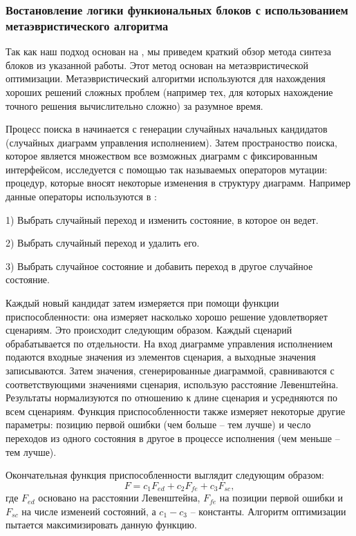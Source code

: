 \documentclass[14pt]{extarticle}
\theoremstyle{plain}
\theoremstyle{definition}
\begin{document}
\subsubsection{Востановление логики функиональных блоков с использованием
метаэвристического алгоритма}

Так как наш подход основан на \cite{rec}, мы приведем краткий обзор метода синтеза
блоков из указанной работы. Этот метод основан на метаэвристической
оптимизации. Метаэвристический алгоритми используются для нахождения хороших
решений сложных проблем (например тех, для которых нахождение точного решения
вычислительно сложно) за разумное время.

Процесс поиска в \cite{rec} начинается с генерации случайных начальных кандидатов
(случайных диаграмм управления исполнением). Затем пространоство поиска,
которое является множеством все возможных диаграмм с фиксированным интерфейсом,
исследуется с помощью так называемых операторов мутации: процедур, которые
вносят некоторые изменения в структуру диаграмм. Например данные операторы
используются в \cite{rec}:

1) Выбрать случайный переход и изменить состояние, в которое он ведет.

2) Выбрать случайный переход и удалить его.

3) Выбрать случайное состояние и добавить переход в другое случайное состояние.

Каждый новый кандидат затем измеряется при помощи функции приспособленности:
она измеряет насколько хорошо решение удовлетворяет сценариям. Это происходит
следующим образом. Каждый сценарий обрабатывается по отдельности. На вход
диаграмме управления исполнением подаются входные значения из элементов
сценария, а выходные значения записываются. Затем значения, сгенерированные
диаграммой, сравниваются с соответствующими значениями сценария, использую
расстояние Левенштейна. Результаты нормализуются по отношению к длине сценария
и усредняются по всем сценариям. Функция приспособленности также измеряет
некоторые другие параметры: позицию первой ошибки (чем больше -- тем лучше) и
чесло переходов из одного состояния в другое в процессе исполнения (чем меньше
-- тем лучше).

Окончательная функция приспособленности выглядит следующим образом:
$$
F = c_1 F_{ed} + c_2 F_{fe} + c_3 F_{sc},
$$
где $F_{ed}$ основано на расстоянии Левенштейна, $F_{fe}$ на позиции первой
ошибки и $F_{sc}$ на числе изменеий состояний, а $c_1 - c_3$ -- константы.
Алгоритм оптимизации пытается максимизировать данную функцию.
\end{document}
